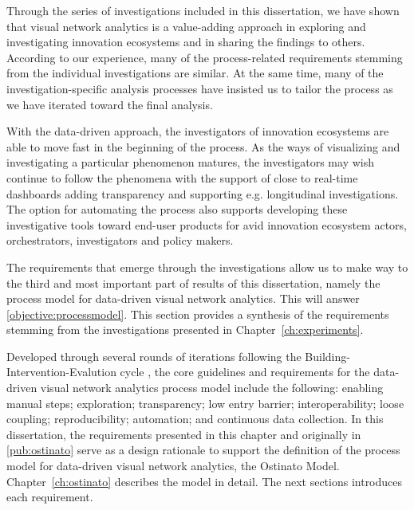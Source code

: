 Through the series of investigations included in this dissertation, we have shown that visual network analytics is a value-adding approach in exploring and investigating innovation ecosystems and in sharing the findings to others. According to our experience, many of the process-related requirements stemming from the individual investigations are similar. At the same time, many of the investigation-specific analysis processes have insisted us to tailor the process as we have iterated toward the final analysis.

With the data-driven approach, the investigators of innovation ecosystems are able to move fast in the beginning of the process. As the ways of visualizing and investigating a particular phenomenon matures, the investigators may wish continue to follow the phenomena with the support of close to real-time dashboards adding transparency and supporting e.g. longitudinal investigations. The option for automating the process also supports developing these investigative tools toward end-user products for avid innovation ecosystem actors, orchestrators, investigators and policy makers.

The requirements that emerge through the investigations allow us to make way to the third and most important part of results of this dissertation, namely the process model for data-driven visual network analytics. This will answer \ref{objective:processmodel}. This section provides a synthesis of the requirements stemming from the investigations presented in Chapter~\ref{ch:experiments}.

Developed through several rounds of iterations following the Building-Intervention-Evalution cycle \citep{Sein2011ActionResearch}, the core guidelines and requirements for the data-driven visual network analytics process model include the following: enabling manual steps; exploration; transparency; low entry barrier; interoperability; loose coupling; reproducibility; automation;   and continuous data collection. In this dissertation, the requirements presented in this chapter and originally in \ref{pub:ostinato} serve as a design rationale to support the definition of the process model for data-driven visual network analytics, the Ostinato Model. Chapter~\ref{ch:ostinato} describes the model in detail. The next sections introduces each requirement.


